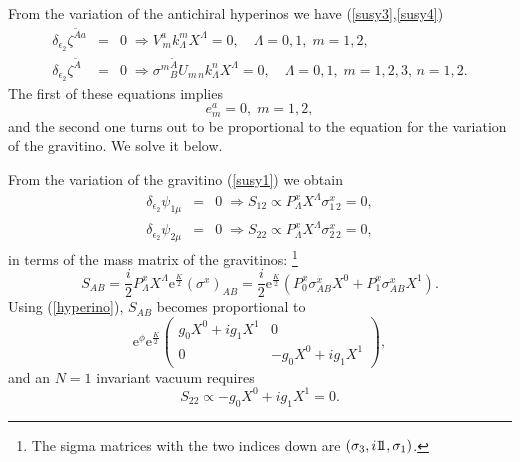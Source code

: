 \documentclass[a4paper,12pt]{article}
\begin{document}
From the variation of the antichiral hyperinos we have
(\ref{susy3},\ref{susy4})
\begin{eqnarray*}\delta_{\epsilon_2}\zeta^{\tilde A a}&=&0\;
\Longrightarrow
V^a_{\,m}k^m_\Lambda X^\Lambda=0, \quad \Lambda=0,1,\; m=1,2,\\
\delta_{\epsilon_2}\zeta^{\tilde A }&=&0\; \Longrightarrow
{\sigma^m}^{\tilde A }_BU_{m\,n}k^n_\Lambda X^\Lambda=0, \quad
\Lambda=0,1,\; m=1,2,3,\, n=1,2.\end{eqnarray*} The first of these
equations implies \begin{equation}e_m^a=0, \;
m=1,2\label{hyperino},\end{equation} and the second one turns out
to be proportional to the equation for the variation of the
gravitino. We solve it below.

\bigskip






From the variation of the gravitino (\ref{susy1}) we obtain
\begin{eqnarray*} \delta_{\epsilon_2}\psi_{1\mu}&=&0\;
\Longrightarrow S_{12}\propto P_\Lambda^xX^\Lambda\sigma^x_{1\,2}=0,\\
 \delta_{\epsilon_2}\psi_{2\mu}&=&0\;
\Longrightarrow S_{22}\propto
P_\Lambda^xX^\Lambda\sigma^x_{2\,2}=0,\end{eqnarray*} in terms of
 the mass matrix of the gravitinos: \footnote{ The sigma
matrices with the two indices down are $(\sigma_3, i\relax{\rm 1\kern-.28em 1},
\sigma_1)$.}
$$S_{AB}= \frac i 2 P_\Lambda^xX^\Lambda\mathrm{e}^{\frac K
2}(\sigma^x)_{AB} =\frac i 2 \mathrm{e}^{\frac K
2}(P_0^x\sigma^x_{AB}X^0+P_1^x\sigma^x_{AB}X^1).$$ Using
(\ref{hyperino}), $S_{AB}$ becomes proportional to
\begin{equation}
\mathrm{e}^{\phi}\mathrm{e}^{\frac K 2}
\begin{pmatrix}g_0X^0+ig_1X^1&0\\
0&-g_0X^0+ig_1X^1\end{pmatrix},\label{massmatrix}\end{equation}
and an $N=1$ invariant vacuum requires \begin{equation}
S_{22}\propto -g_0X^0+ig_1X^1=0.\label{s22}\end{equation}

\bigskip
\end{document}

